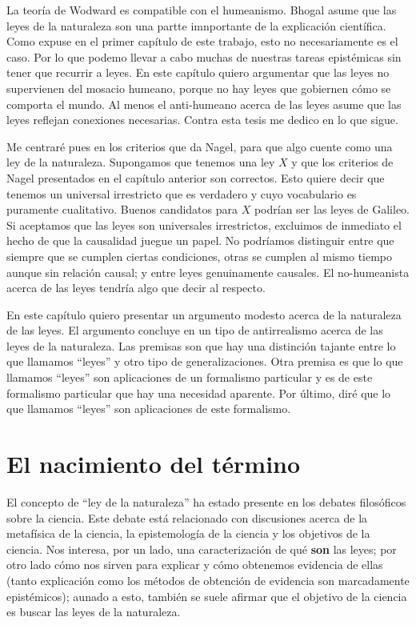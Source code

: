 La teoría de Wodward es compatible con el humeanismo. Bhogal asume que las leyes de la naturaleza son una partte imnportante de la explicación científica. Como expuse en el primer capítulo de este trabajo, esto no necesariamente es el caso. Por lo que podemo llevar a cabo muchas de nuestras tareas epistémicas sin tener que recurrir a leyes. En este capítulo quiero argumentar que las leyes no supervienen del mosacio humeano, porque no hay leyes que gobiernen cómo se comporta el mundo. Al menos el anti-humeano acerca de las leyes asume que las leyes reflejan conexiones necesarias. Contra esta tesis me dedico en lo que sigue.

Me centraré pues en los criterios que da Nagel, para que algo cuente como una ley de la naturaleza. Supongamos que tenemos una ley $X$ y que los criterios de Nagel presentados en el capítulo anterior son correctos. Esto quiere decir que tenemos un universal irrestricto que es verdadero y cuyo vocabulario es puramente cualitativo. Buenos candidatos para $X$ podrían ser las leyes de Galileo. Si aceptamos que las leyes son universales irrestrictos, excluimos de inmediato el hecho de que la causalidad juegue un papel. No podríamos distinguir entre que siempre que se cumplen ciertas condiciones, otras se cumplen al mismo tiempo aunque sin relación causal; y entre leyes genuinamente causales. El no-humeanista acerca de las leyes tendría algo que decir al respecto.

En este capítulo quiero presentar un argumento modesto acerca de la naturaleza de las leyes. El argumento concluye en un tipo de antirrealismo acerca de las leyes de la naturaleza. Las premisas son que hay una distinción tajante entre lo que llamamos ``leyes'' y otro tipo de generalizaciones. Otra premisa es que lo que llamamos ``leyes'' son aplicaciones de un formalismo particular y es de este formalismo particular que hay una necesidad aparente. Por último, diré que lo que llamamos ``leyes'' son aplicaciones de este formalismo.

\section{El nacimiento del término}

\noindent El concepto de ``ley de la naturaleza'' ha estado presente en los debates filosóficos sobre la ciencia. Este debate está relacionado con discusiones acerca de la metafísica de la ciencia, la epistemología de la ciencia y los objetivos de la ciencia. Nos interesa, por un lado, una caracterización de qué \textbf{son} las leyes; por otro lado cómo nos sirven para explicar y cómo obtenemos evidencia de ellas (tanto explicación como los métodos de obtención de evidencia son marcadamente epistémicos); aunado a esto, también se suele afirmar que el objetivo de la ciencia es buscar las leyes de la naturaleza.

